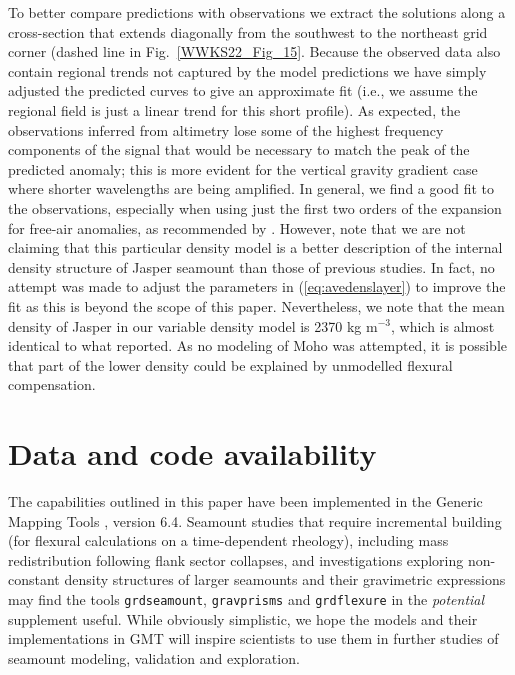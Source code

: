 To better compare predictions with observations we extract the solutions along a cross-section that extends diagonally
from the southwest to the northeast grid corner (dashed line in Fig.~\ref{WWKS22_Fig_15}.  Because the observed data
also contain regional trends not captured by the model predictions we have simply adjusted the predicted curves to
give an approximate fit (i.e., we assume the regional field is just a linear trend for this short profile).  As expected,
the observations inferred from altimetry lose some of the highest frequency components of the signal that would be
necessary to match the peak of the predicted anomaly; this is more evident for the vertical gravity gradient case where shorter
wavelengths are being amplified.  In general, we find a good fit to the observations, especially when using just the first
two orders of the \citet{P1972} expansion for free-air anomalies, as recommended by \citet{MS2007}.  However, note that we
are not claiming that this particular density model is a better description of the  internal density structure of Jasper
seamount than those of previous studies.  In fact, no attempt was made to adjust the parameters in (\ref{eq:avedenslayer})
to improve the fit as this is beyond the scope of this paper. Nevertheless, we note that the mean density of Jasper in
our variable density model is 2370 kg m$^{-3}$, which is almost identical to what \citet{H1991} reported. As no modeling of
Moho was attempted, it is possible that part of the lower density could be explained by unmodelled flexural compensation.

\section{Data and code availability}

The capabilities outlined in this paper have been implemented in the Generic Mapping Tools \citep{Wetal2019}, version 6.4.
Seamount studies that require incremental building (for flexural calculations on a time-dependent rheology), including
mass redistribution following flank sector collapses, and investigations exploring non-constant density structures of larger
seamounts and their gravimetric expressions may find the tools \texttt{grdseamount}, \texttt{gravprisms} and \texttt{grdflexure}
in the {\it potential} supplement useful. While obviously simplistic, we hope the models and their implementations
in GMT will inspire scientists to use them in further studies of seamount modeling, validation and exploration.


